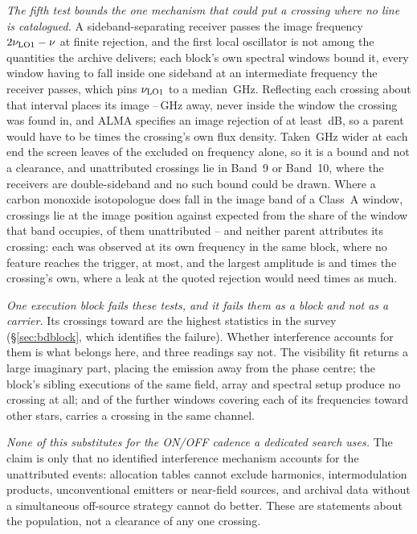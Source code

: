 \emph{The fifth test bounds the one mechanism that could put a crossing where
no line is catalogued.} A sideband-separating receiver passes the
image frequency $2\nu_{\rm LO1}-\nu$ at finite rejection, and the first
local oscillator is not among the quantities the archive delivers; each
block's own spectral windows bound it, every window having to
fall inside one sideband at an intermediate frequency the receiver passes,
which pins $\nu_{\rm LO1}$ to a median \ImLoWidthBlkGHz\,GHz. Reflecting each
crossing about that interval places its image \ImGapLoGHz--\ImGapHiGHz\,GHz
away, never inside the window the crossing was found in, and ALMA specifies
an image rejection of at least \ImIrrDb\,dB, so a parent would have to be
\ImIrrFac{} times the crossing's own flux density. Taken \ImWideGHz\,GHz
wider at each end the screen leaves \ImNNoParentWide{} of the \ImNScreen{}
excluded on frequency alone, so it is a bound and not a clearance, and
\ImNDsb{} unattributed crossings lie in Band~9 or Band~10, where the
receivers are double-sideband and no such bound could be drawn. Where a
carbon monoxide isotopologue does fall in the image band of a Class~A window,
\ScImNHitCross{} crossings lie at the image position against \ScImExp{}
expected from the share of the window that band occupies, \ScImNHitUn{} of
them unattributed -- and neither parent attributes its crossing: each was
observed at its own frequency in the same block, where no
feature reaches the trigger, \ScImUnParMaxT{} at most, and the largest
amplitude is \ScImUnRatioA{} and \ScImUnRatioB{} times the crossing's own,
where a leak at the quoted rejection would need \ImIrrFac{} times as much.

\emph{One execution block fails these tests, and it fails them as a block
and not as a carrier.} Its \DqBlockNCross{} crossings toward
\LgVerRejectStar{} are the \DqBlockNCross{} highest statistics in the survey
(\S\ref{sec:bdblock}, which identifies the failure). Whether interference
accounts for them is what belongs here, and three readings say not. The
visibility fit returns a large imaginary part,
placing the emission away from the phase centre; the block's
\BdNSibling{} sibling executions of the same field, array and spectral setup
produce no crossing at all; and of the further windows covering each of its
frequencies toward other stars, \DqOtherSame{} carries a crossing in the
same channel.

\emph{None of this substitutes for the ON/OFF cadence a dedicated search
uses.} The claim is only that no
identified interference mechanism accounts for the unattributed events:
allocation tables cannot exclude harmonics, intermodulation products,
unconventional emitters or near-field sources, and archival data without a
simultaneous off-source strategy cannot do better. These are statements about
the population, not a clearance of any one crossing.


